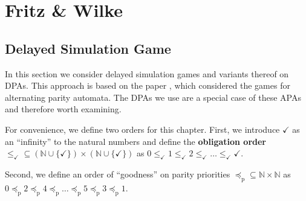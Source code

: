
\section{Fritz \& Wilke}
\label{sect:fritzwilke}

\subsection{Delayed Simulation Game}
In this section we consider delayed simulation games and variants thereof on DPAs. This approach is based on the paper \cite{FritzWilke06}, which considered the games for alternating parity automata. The DPAs we use are a special case of these APAs and therefore worth examining.

\begin{defn}
	For convenience, we define two orders for this chapter. First, we introduce $\checkmark$ as an \enquote{infinity} to the natural numbers and define the \textbf{obligation order} $\leq_\checkmark \subseteq (\mathbb{N} \cup \{\checkmark\}) \times (\mathbb{N} \cup \{\checkmark\})$ as $0 \leq_\checkmark 1 \leq_\checkmark 2 \leq_\checkmark \dots \leq_\checkmark \checkmark$.
	
	Second, we define an order of \enquote{goodness} on parity priorities $\preceq_\text{p} \subseteq \mathbb{N} \times \mathbb{N}$ as $0 \preceq_\text{p} 2 \preceq_\text{p} 4 \preceq_\text{p} \dots \preceq_\text{p} 5 \preceq_\text{p} 3 \preceq_\text{p} 1$.
\end{defn}

